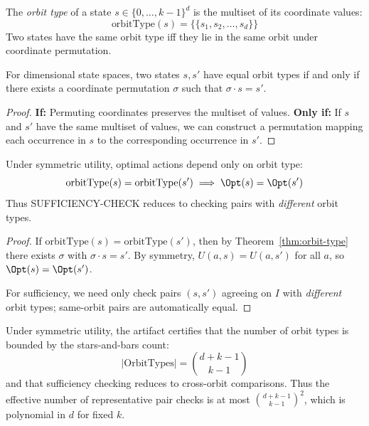 \begin{definition}\label{def:orbit-type}
The \emph{orbit type} of a state $s \in \{0, \ldots, k-1\}^d$ is the multiset of its coordinate values:
\[
\text{orbitType}(s) = \{\!\{s_1, s_2, \ldots, s_d\}\!\}
\]
Two states have the same orbit type iff they lie in the same orbit under coordinate permutation.
\end{definition}

\begin{theorem}\label{thm:orbit-type}
For dimensional state spaces, two states $s, s'$ have equal orbit types if and only if there exists a coordinate permutation $\sigma$ such that $\sigma \cdot s = s'$.
\end{theorem}


\begin{proof}
\textbf{If:} Permuting coordinates preserves the multiset of values.
\textbf{Only if:} If $s$ and $s'$ have the same multiset of values, we can construct a permutation mapping each occurrence in $s$ to the corresponding occurrence in $s'$.
\end{proof}

\begin{theorem}\label{thm:symmetric-reduction}
Under symmetric utility, optimal actions depend only on orbit type:
\[
\text{orbitType}(s) = \text{orbitType}(s') \implies \Opt(s) = \Opt(s')
\]
Thus SUFFICIENCY-CHECK reduces to checking pairs with \emph{different} orbit types.
\end{theorem}


\begin{proof}
If $\text{orbitType}(s) = \text{orbitType}(s')$, then by Theorem~\ref{thm:orbit-type} there exists $\sigma$ with $\sigma \cdot s = s'$. By symmetry, $U(a, s) = U(a, s')$ for all $a$, so $\Opt(s) = \Opt(s')$.

For sufficiency, we need only check pairs $(s, s')$ agreeing on $I$ with \emph{different} orbit types; same-orbit pairs are automatically equal.
\end{proof}

\begin{theorem}\label{thm:symmetric-complexity}
Under symmetric utility, the artifact certifies that the number of orbit types is bounded by the stars-and-bars count:
\[
|\text{OrbitTypes}| = \binom{d + k - 1}{k - 1}
\]
and that sufficiency checking reduces to cross-orbit comparisons. Thus the effective number of representative pair checks is at most $\binom{d + k - 1}{k - 1}^2$, which is polynomial in $d$ for fixed $k$.
\end{theorem}

